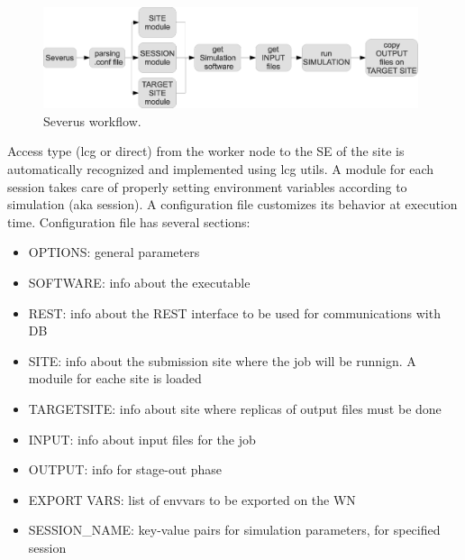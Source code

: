 \documentclass[a4paper]{jpconf}
\begin{document}
\begin{figure}[h]
\includegraphics[width=26pc]{img/severus_workflow.eps}\hspace{2pc}%
\caption{\label{fig:severus_workflow}Severus workflow.}
\end{figure}

Access type (lcg or direct) from the worker node to the SE of the site is automatically recognized and implemented using lcg utils.
A module for each session takes care of properly setting environment variables according to simulation (aka session).
A configuration file customizes its behavior at execution time.
Configuration file has several sections:
\begin{itemize}
\item OPTIONS: general parameters
\item SOFTWARE: info about the executable
\item REST: info about the REST interface to be used for communications with DB
\item SITE: info about the submission site where the job will be runnign. A moduile for eache site is loaded
\item TARGETSITE:  info about site where replicas of output files must be done
\item INPUT: info about input files for the job
\item OUTPUT: info for stage-out phase
\item EXPORT VARS: list of envvars to be exported on the WN
\item SESSION\_NAME: key-value pairs for simulation parameters, for specified session
\end{itemize}
 
\end{document}
